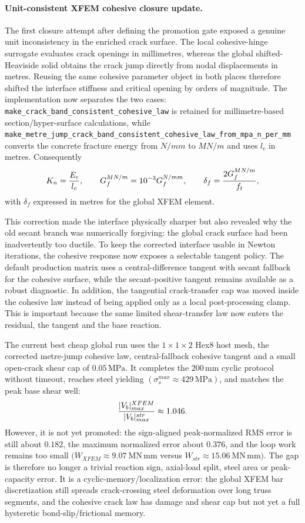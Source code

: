 \paragraph{Unit-consistent XFEM cohesive closure update.}
The first closure attempt after defining the promotion gate exposed a genuine
unit inconsistency in the enriched crack surface.  The local cohesive-hinge
surrogate evaluates crack openings in millimetres, whereas the global
shifted-Heaviside solid obtains the crack jump directly from nodal
displacements in metres.  Reusing the same cohesive parameter object in both
places therefore shifted the interface stiffness and critical opening by
orders of magnitude.  The implementation now separates the two cases:
\texttt{make\_crack\_band\_consistent\_cohesive\_law} is retained for
millimetre-based section/hyper-surface calculations, while
\texttt{make\_metre\_jump\_crack\_band\_consistent\_cohesive\_law\_from\_mpa\_n\_per\_mm}
converts the concrete fracture energy from \(N/mm\) to \(MN/m\) and uses
\(l_c\) in metres.  Consequently
\[
  K_n = {E_c\over l_c},\qquad
  G_f^{MN/m}=10^{-3}G_f^{N/mm},\qquad
  \delta_f = {2G_f^{MN/m}\over f_t},
\]
with \(\delta_f\) expressed in metres for the global XFEM element.

This correction made the interface physically sharper but also revealed why
the old secant branch was numerically forgiving: the global crack surface had
been inadvertently too ductile.  To keep the corrected interface usable in
Newton iterations, the cohesive response now exposes a selectable tangent
policy.  The default production matrix uses a central-difference tangent with
secant fallback for the cohesive surface, while the secant-positive tangent
remains available as a robust diagnostic.  In addition, the tangential
crack-transfer cap was moved inside the cohesive law instead of being applied
only as a local post-processing clamp.  This is important because the same
limited shear-transfer law now enters the residual, the tangent and the base
reaction.

The current best cheap global run uses the \(1\times1\times2\) Hex8 host mesh,
the corrected metre-jump cohesive law, central-fallback cohesive tangent and a
small open-crack shear cap of \(0.05\,\mathrm{MPa}\).  It completes the
\(200\,\mathrm{mm}\) cyclic protocol without timeout, reaches steel yielding
\((\sigma_s^{max}\approx429\,\mathrm{MPa})\), and matches the peak base shear
well:
\[
  {|V_b|^{XFEM}_{max}\over |V_b|^{str}_{max}}\approx1.046.
\]
However, it is not yet promoted: the sign-aligned peak-normalized RMS error is
still about \(0.182\), the maximum normalized error about \(0.376\), and the
loop work remains too small
\((W_{XFEM}\approx9.07\ \mathrm{MN\,mm}\) versus
\(W_{str}\approx15.06\ \mathrm{MN\,mm})\).  The gap is therefore no longer a
trivial reaction sign, axial-load split, steel area or peak-capacity error.  It
is a cyclic-memory/localization error: the global XFEM bar discretization still
spreads crack-crossing steel deformation over long truss segments, and the
cohesive crack law has damage and shear cap but not yet a full hysteretic
bond-slip/frictional memory.

